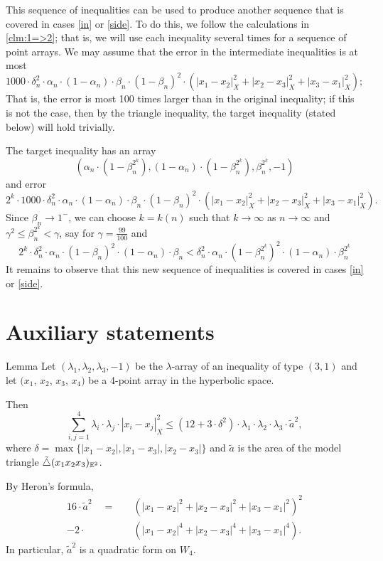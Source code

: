 \documentclass[a4paper,10pt]{article}
\begin{document}
This sequence of inequalities can be used to produce another sequence that is covered in cases \ref{in} or \ref{side}.
To do this, we follow the calculations in \ref{clm:1=>2};
that is, we will use each inequality several times for a sequence of point arrays.
We may assume that the error in the intermediate inequalities is at most
\[1000\cdot\delta_n^2\cdot\alpha_n\cdot(1-\alpha_n)\cdot\beta_n\cdot(1-\beta_n)^2 \cdot (|x_1-x_2|_X^2+|x_2-x_3|_X^2+|x_3-x_1|_X^2);\]
That is, the error is most 100 times larger than in the original inequality; if this is not the case, then by the triangle inequality, the target inequality (stated below) will hold trivially.

The target inequality has an array
\[(\alpha_n\cdot(1-\beta_n^{2^k}),(1-\alpha_n)\cdot(1-\beta_n^{2^k}),\beta_n^{2^k},-1)\]
and error
\[2^k\cdot1000\cdot\delta_n^2\cdot\alpha_n\cdot(1-\alpha_n)\cdot\beta_n\cdot(1-\beta_n)^2 \cdot (|x_1-x_2|_X^2+|x_2-x_3|_X^2+|x_3-x_1|_X^2).\]
Since $\beta_n\to 1^-$, we can choose $k=k(n)$ such that $k\to \infty$ as $n\to \infty$ and $\gamma^2\le \beta_n^{2^k}<\gamma$, say for $\gamma=\tfrac{99}{100}$ and
\[
2^k\cdot\delta_n^2\cdot \alpha_n\cdot(1-\beta_n)^2\cdot(1-\alpha_n)\cdot\beta_n
<
\delta_n^2\cdot \alpha_n\cdot(1-\beta_n^{2^k})^2\cdot(1-\alpha_n)\cdot\beta_n^{2^k}
\]
It remains to observe that this new sequence of inequalities is covered in cases \ref{in} or \ref{side}.
\qeds

\section{Auxiliary statements}\label{Auxiliary statements}

\begin{thm}{Lemma}\label{lem:area-bound}
Let $(\lambda_1,\lambda_2,\lambda_3,-1)$ be the $\lambda$-array of an inequality of type $(3,1)$ and
let $(x_1$, $x_2$, $x_3$, $x_4)$ be a 4-point array in the hyperbolic space.

Then
\[\sum_{i,j=1}^4\lambda_i\cdot\lambda_j\cdot|x_i-x_j|_X^2
\le
(12+3\cdot\delta^2)\cdot\lambda_1\cdot\lambda_2\cdot\lambda_3\cdot\tilde a^2,\]
where $\delta=\max\{|x_1-x_2|,|x_1-x_3|,|x_2-x_3|\}$
and
$\tilde a$ is the area of the model triangle $\tilde\triangle(x_1x_2x_3)_{\mathbb{E}^2}$.
\end{thm}

By Heron's formula,
\begin{align*}
16\cdot \tilde a^2
\quad=\quad &(|x_1-x_2|^2+|x_2-x_3|^2+|x_3-x_1|^2)^2
\\
-2\cdot &(|x_1-x_2|^4+|x_2-x_3|^4+|x_3-x_1|^4).
\end{align*}
In particular, $\tilde a^2$ is a quadratic form on $W_4$.
\end{document}

